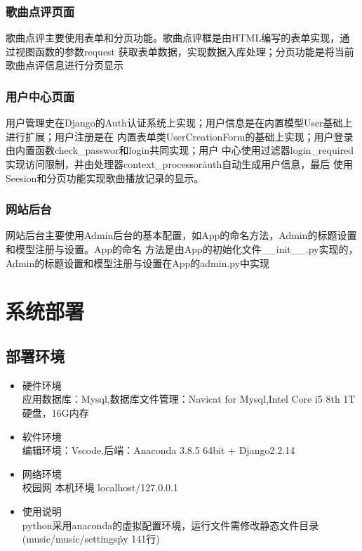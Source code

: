 \documentclass[UTF8,14pt]{article}
\numberwithin{figure}{subsubsection}
\numberwithin{table}{subsubsection}
\begin{document}
\vspace*{-0.3cm}
\subsubsection{歌曲点评页面}
歌曲点评主要使用表单和分页功能。歌曲点评框是由HTML编写的表单实现，通过视图函数的参数request
获取表单数据，实现数据入库处理；分页功能是将当前歌曲点评信息进行分页显示
\vspace*{-0.3cm}
\subsubsection{用户中心页面}
用户管理史在Django的Auth认证系统上实现；用户信息是在内置模型User基础上进行扩展；用户注册是在
内置表单类UserCreationForm的基础上实现；用户登录由内置函数check\_passwor和login共同实现；用户
中心使用过滤器login\_required实现访问限制，并由处理器context\_processor\.auth自动生成用户信息，最后
使用Seesion和分页功能实现歌曲播放记录的显示。
\vspace*{-0.3cm}
\subsubsection{网站后台}
网站后台主要使用Admin后台的基本配置，如App的命名方法，Admin的标题设置和模型注册与设置。App的命名
方法是由App的初始化文件\_\_init\_\_.py实现的，Admin的标题设置和模型注册与设置在App的admin.py中实现
\section{系统部署}
\subsection{部署环境}
\begin{itemize}
	\item 硬件环境\\
	      应用数据库：Mysql,数据库文件管理：Navicat for Mysql,Intel Core i5 8th 1T硬盘，16G内存
	\item 软件环境\\
	      编辑环境：Vscode,后端：Anaconda 3.8.5 64bit + Django2.2.14
	\item 网络环境\\
	      校园网 本机环境 localhost/127.0.0.1
	\item 使用说明\\
	      python采用anaconda的虚拟配置环境，运行文件需修改静态文件目录(music/music/settings\.py 141行)
\end{itemize}
\end{document}
